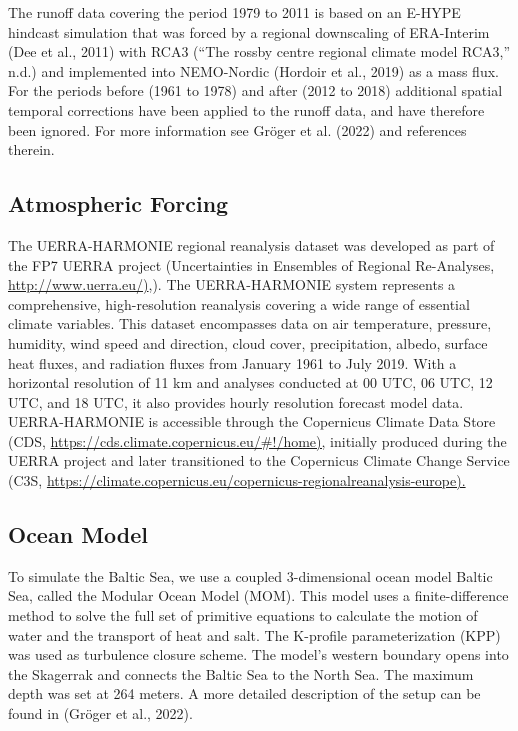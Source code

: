 \documentclass[
]{agujournal2019}
\begin{document}
The runoff data covering the period 1979 to 2011 is based on an E-HYPE
hindcast simulation that was forced by a regional downscaling of
ERA-Interim (Dee et al., 2011) with RCA3 ({``The rossby centre regional
climate model RCA3,''} n.d.) and implemented into NEMO-Nordic (Hordoir
et al., 2019) as a mass flux. For the periods before (1961 to 1978) and
after (2012 to 2018) additional spatial temporal corrections have been
applied to the runoff data, and have therefore been ignored. For more
information see Gröger et al. (2022) and references therein.

\hypertarget{atmospheric-forcing}{%
\subsection{Atmospheric Forcing}\label{atmospheric-forcing}}

The UERRA-HARMONIE regional reanalysis dataset was developed as part of
the FP7 UERRA project (Uncertainties in Ensembles of Regional
Re-Analyses, \href{http://www.uerra.eu/}{http://www.uerra.eu/)},). The
UERRA-HARMONIE system represents a comprehensive, high-resolution
reanalysis covering a wide range of essential climate variables. This
dataset encompasses data on air temperature, pressure, humidity, wind
speed and direction, cloud cover, precipitation, albedo, surface heat
fluxes, and radiation fluxes from January 1961 to July 2019. With a
horizontal resolution of 11 km and analyses conducted at 00 UTC, 06 UTC,
12 UTC, and 18 UTC, it also provides hourly resolution forecast model
data. UERRA-HARMONIE is accessible through the Copernicus Climate Data
Store (CDS, \url{https://cds.climate.copernicus.eu/\#!/home),} initially
produced during the UERRA project and later transitioned to the
Copernicus Climate Change Service (C3S,
\url{https://climate.copernicus.eu/copernicus-regionalreanalysis-europe).}

\hypertarget{ocean-model}{%
\subsection{Ocean Model}\label{ocean-model}}

To simulate the Baltic Sea, we use a coupled 3-dimensional ocean model
Baltic Sea, called the Modular Ocean Model (MOM). This model uses a
finite-difference method to solve the full set of primitive equations to
calculate the motion of water and the transport of heat and salt. The
K-profile parameterization (KPP) was used as turbulence closure scheme.
The model's western boundary opens into the Skagerrak and connects the
Baltic Sea to the North Sea. The maximum depth was set at 264 meters. A
more detailed description of the setup can be found in (Gröger et al.,
2022).
\end{document}
